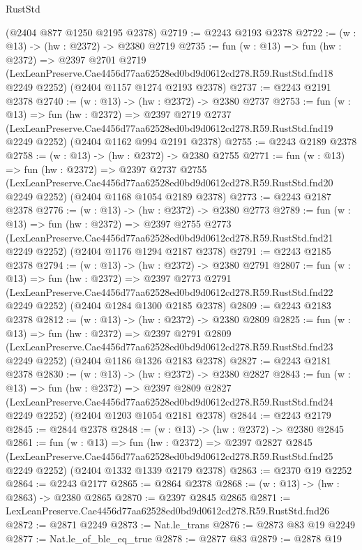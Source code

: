 \begin{lexlean}{RustStd}
\begin{coremodule}
    (@2404 @877 @1250 @2195 @2378)
@2719 := @2243 @2193 @2378
@2722 := (w : @13) -> (hw : @2372) -> @2380 @2719
@2735 := fun (w : @13) =>
  fun (hw : @2372) =>
  @2397
    @2701
    @2719
    (LexLeanPreserve.Cae4456d77aa62528ed0bd9d0612cd278.R59.RustStd.fnd18 @2249 @2252)
    (@2404 @1157 @1274 @2193 @2378)
@2737 := @2243 @2191 @2378
@2740 := (w : @13) -> (hw : @2372) -> @2380 @2737
@2753 := fun (w : @13) =>
  fun (hw : @2372) =>
  @2397
    @2719
    @2737
    (LexLeanPreserve.Cae4456d77aa62528ed0bd9d0612cd278.R59.RustStd.fnd19 @2249 @2252)
    (@2404 @1162 @994 @2191 @2378)
@2755 := @2243 @2189 @2378
@2758 := (w : @13) -> (hw : @2372) -> @2380 @2755
@2771 := fun (w : @13) =>
  fun (hw : @2372) =>
  @2397
    @2737
    @2755
    (LexLeanPreserve.Cae4456d77aa62528ed0bd9d0612cd278.R59.RustStd.fnd20 @2249 @2252)
    (@2404 @1168 @1054 @2189 @2378)
@2773 := @2243 @2187 @2378
@2776 := (w : @13) -> (hw : @2372) -> @2380 @2773
@2789 := fun (w : @13) =>
  fun (hw : @2372) =>
  @2397
    @2755
    @2773
    (LexLeanPreserve.Cae4456d77aa62528ed0bd9d0612cd278.R59.RustStd.fnd21 @2249 @2252)
    (@2404 @1176 @1294 @2187 @2378)
@2791 := @2243 @2185 @2378
@2794 := (w : @13) -> (hw : @2372) -> @2380 @2791
@2807 := fun (w : @13) =>
  fun (hw : @2372) =>
  @2397
    @2773
    @2791
    (LexLeanPreserve.Cae4456d77aa62528ed0bd9d0612cd278.R59.RustStd.fnd22 @2249 @2252)
    (@2404 @1284 @1300 @2185 @2378)
@2809 := @2243 @2183 @2378
@2812 := (w : @13) -> (hw : @2372) -> @2380 @2809
@2825 := fun (w : @13) =>
  fun (hw : @2372) =>
  @2397
    @2791
    @2809
    (LexLeanPreserve.Cae4456d77aa62528ed0bd9d0612cd278.R59.RustStd.fnd23 @2249 @2252)
    (@2404 @1186 @1326 @2183 @2378)
@2827 := @2243 @2181 @2378
@2830 := (w : @13) -> (hw : @2372) -> @2380 @2827
@2843 := fun (w : @13) =>
  fun (hw : @2372) =>
  @2397
    @2809
    @2827
    (LexLeanPreserve.Cae4456d77aa62528ed0bd9d0612cd278.R59.RustStd.fnd24 @2249 @2252)
    (@2404 @1203 @1054 @2181 @2378)
@2844 := @2243 @2179
@2845 := @2844 @2378
@2848 := (w : @13) -> (hw : @2372) -> @2380 @2845
@2861 := fun (w : @13) =>
  fun (hw : @2372) =>
  @2397
    @2827
    @2845
    (LexLeanPreserve.Cae4456d77aa62528ed0bd9d0612cd278.R59.RustStd.fnd25 @2249 @2252)
    (@2404 @1332 @1339 @2179 @2378)
@2863 := @2370 @19 @2252
@2864 := @2243 @2177
@2865 := @2864 @2378
@2868 := (w : @13) -> (hw : @2863) -> @2380 @2865
@2870 := @2397 @2845 @2865
@2871 := LexLeanPreserve.Cae4456d77aa62528ed0bd9d0612cd278.R59.RustStd.fnd26
@2872 := @2871 @2249
@2873 := Nat.le_trans
@2876 := @2873 @83 @19 @2249
@2877 := Nat.le_of_ble_eq_true
@2878 := @2877 @83
@2879 := @2878 @19

\end{coremodule}
\end{lexlean}
